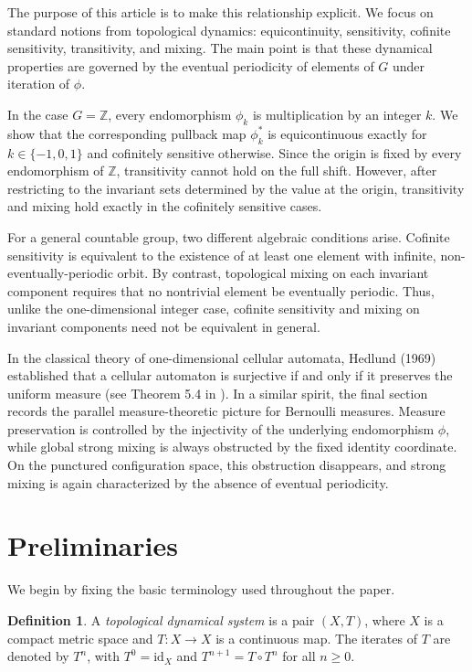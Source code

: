 \documentclass[12pt,a4paper]{article}
\theoremstyle{definition}
\newtheorem{definition}[theorem]{Definition}
\theoremstyle{remark}
\newcommand{\ZZ}{\mathbb{Z}}
\begin{document}
The purpose of this article is to make this relationship explicit. We focus on standard notions from topological dynamics: equicontinuity, sensitivity, cofinite sensitivity, transitivity, and mixing. The main point is that these dynamical properties are governed by the eventual periodicity of elements of $G$ under iteration of $\phi$.

In the case $G=\ZZ$, every endomorphism $\phi_k$ is multiplication by an integer $k$. We show that the corresponding pullback map $\phi_k^*$ is equicontinuous exactly for $k\in\{-1,0,1\}$ and cofinitely sensitive otherwise. Since the origin is fixed by every endomorphism of $\ZZ$, transitivity cannot hold on the full shift. However, after restricting to the invariant sets determined by the value at the origin, transitivity and mixing hold exactly in the cofinitely sensitive cases.



For a general countable group, two different algebraic conditions arise. Cofinite sensitivity is equivalent to the existence of at least one element with infinite, non-eventually-periodic orbit. By contrast, topological mixing on each invariant component requires that no nontrivial element be eventually periodic. Thus, unlike the one-dimensional integer case, cofinite sensitivity and mixing on invariant components need not be equivalent in general.

In the classical theory of one-dimensional cellular automata, Hedlund (1969) established that a cellular automaton is surjective if and only if it preserves the uniform measure (see Theorem 5.4 in \cite{Hedlund1969}). In a similar spirit, the final section records the parallel measure-theoretic picture for Bernoulli measures. Measure preservation is controlled by the injectivity of the underlying endomorphism $\phi$, while global strong mixing is always obstructed by the fixed identity coordinate. On the punctured configuration space, this obstruction disappears, and strong mixing is again characterized by the absence of eventual periodicity.

\section{Preliminaries}\label{sec:preliminaries}

We begin by fixing the basic terminology used throughout the paper.

\begin{definition}
A \emph{topological dynamical system} is a pair $(X,T)$, where $X$ is a compact metric space and $T:X\to X$ is a continuous map. The iterates of $T$ are denoted by $T^n$, with $T^0=\mathrm{id}_X$ and $T^{n+1}=T\circ T^n$ for all $n\geq 0$.
\end{definition}
\end{document}
